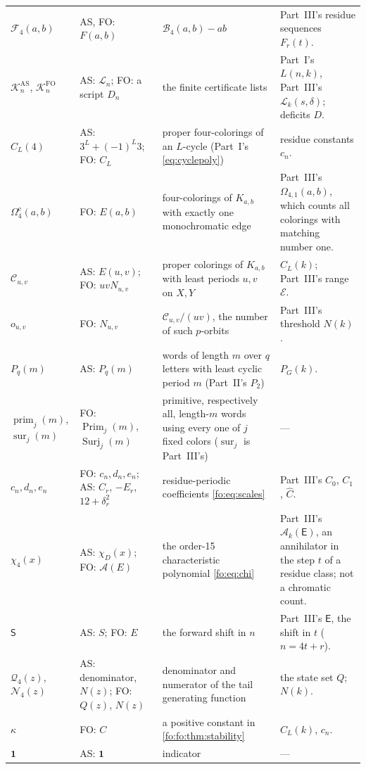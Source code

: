 \documentclass[11pt,a4paper]{article}
\numberwithin{equation}{section}
\theoremstyle{definition}
\theoremstyle{remark}
\newcommand{\Bip}{\mathcal B}
\newcommand{\bbone}{\mathbf 1}
\newcommand{\sur}{\operatorname{sur}}
\begin{document}
{\begin{longtable}{>{\raggedright}p{.15\linewidth}>{\raggedright}p{.21\linewidth}>{\raggedright}p{.26\linewidth}>{\raggedright\arraybackslash}p{.26\linewidth}}
$\mathcal F_4(a,b)$ & AS, FO: $F(a,b)$ & $\Bip_4(a,b)-ab$ & Part~III's residue
 sequences $F_r(t)$.\\
$\mathcal K^{\mathrm{AS}}_n$, $\mathcal K^{\mathrm{FO}}_n$ & AS: $\mathcal L_n$; FO:
 a script $D_n$ & the finite certificate lists & Part~I's $L(n,k)$, Part~III's
 $\mathcal L_k(s,\delta)$; deficits $D$.\\
$C_L(4)$ & AS: $3^L+(-1)^L3$; FO: $C_L$ & proper four-colorings of an
 $L$-cycle (Part~I's \eqref{eq:cyclepoly}) & residue constants $c_n$.\\
$\Omega^{\mathrm e}_4(a,b)$ & FO: $E(a,b)$ & four-colorings of $K_{a,b}$ with
 exactly one monochromatic edge & Part~III's $\Omega_{4,1}(a,b)$, which counts
 all colorings with matching number one.\\
$\mathcal C_{u,v}$ & AS: $E(u,v)$; FO: $uvN_{u,v}$ & proper colorings of
 $K_{a,b}$ with least periods $u,v$ on $X,Y$ & $C_L(k)$; Part~III's range
 $\mathcal E$.\\
$o_{u,v}$ & FO: $N_{u,v}$ & $\mathcal C_{u,v}/(uv)$, the number of such
 $p$-orbits & Part~III's threshold $N(k)$.\\
$P_q(m)$ & AS: $P_q(m)$ & words of length $m$ over $q$ letters with least
 cyclic period $m$ (Part~II's $P_2$) & $P_G(k)$.\\
$\operatorname{prim}_j(m)$, $\sur_j(m)$ & FO: $\operatorname{Prim}_j(m)$,
 $\operatorname{Surj}_j(m)$ & primitive, respectively all, length-$m$ words
 using every one of $j$ fixed colors ($\sur_j$ is Part~III's) & ---\\
$c_n,d_n,e_n$ & FO: $c_n,d_n,e_n$; AS: $C_r$, $-E_r$, $12+\delta_r^2$ &
 residue-periodic coefficients \eqref{fo:eq:scales} & Part~III's $C_0$, $C_1$,
 $\hat C$.\\
$\chi_4(x)$ & AS: $\chi_D(x)$; FO: $\mathcal A(E)$ & the order-15
 characteristic polynomial \eqref{fo:eq:chi} & Part~III's $\mathcal A_k(\mathsf E)$,
 an annihilator in the step $t$ of a residue class; not a chromatic count.\\
$\mathsf S$ & AS: $S$; FO: $E$ & the forward shift in $n$ & Part~III's
 $\mathsf E$, the shift in $t$ ($n=4t+r$).\\
$\mathcal Q_4(z)$, $\mathcal N_4(z)$ & AS: denominator, $N(z)$; FO: $Q(z)$,
 $N(z)$ & denominator and numerator of the tail generating function & the
 state set $Q$; $N(k)$.\\
$\kappa$ & FO: $C$ & a positive constant in \cref{fo:fo:thm:stability} &
 $C_L(k)$, $c_n$.\\
$\bbone$ & AS: $\mathbf 1$ & indicator & ---\\
\end{longtable}}
\end{document}
